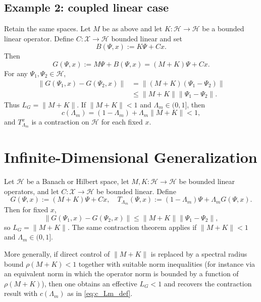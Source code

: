 \documentclass[11pt]{article}
\begin{document}
\subsection{Example 2: coupled linear case}

Retain the same spaces. Let $M$ be as above and let $K : \mathcal{H} \to \mathcal{H}$ be a bounded linear operator. Define $C : \mathcal{X} \to \mathcal{H}$ bounded linear and set
\begin{equation}
  B(\Psi,x) := K\Psi + Cx.
\end{equation}
Then
\begin{equation}
  G(\Psi,x) := M\Psi + B(\Psi,x)
  =
  (M+K)\Psi + Cx.
\end{equation}
For any $\Psi_1,\Psi_2 \in \mathcal{H}$,
\begin{align*}
  \|G(\Psi_1,x) - G(\Psi_2,x)\|
  &=
  \|(M+K)(\Psi_1 - \Psi_2)\| \\
  &\leq
  \|M+K\| \|\Psi_1 - \Psi_2\|.
\end{align*}
Thus $L_G = \|M+K\|$. If $\|M+K\| < 1$ and $\Lambda_m \in (0,1]$, then
\begin{equation}
  c(\Lambda_m) = (1 - \Lambda_m) + \Lambda_m \|M+K\| < 1,
\end{equation}
and $T_{\Lambda_m}^x$ is a contraction on $\mathcal{H}$ for each fixed $x$.

\section{Infinite-Dimensional Generalization}

\begin{remark}
Let $\mathcal{H}$ be a Banach or Hilbert space, let $M,K : \mathcal{H} \to \mathcal{H}$ be bounded linear operators, and let $C : \mathcal{X} \to \mathcal{H}$ be bounded linear. Define
\begin{equation}
  G(\Psi,x) := (M+K)\Psi + Cx,
  \quad
  T_{\Lambda_m}(\Psi,x)
  := (1 - \Lambda_m)\Psi + \Lambda_m G(\Psi,x).
\end{equation}
Then for fixed $x$,
\begin{equation}
  \|G(\Psi_1,x) - G(\Psi_2,x)\|
  \leq
  \|M+K\| \|\Psi_1 - \Psi_2\|,
\end{equation}
so $L_G = \|M+K\|$. The same contraction theorem applies if $\|M+K\| < 1$ and $\Lambda_m \in (0,1]$.

More generally, if direct control of $\|M+K\|$ is replaced by a spectral radius bound $\rho(M+K) < 1$ together with suitable norm inequalities (for instance via an equivalent norm in which the operator norm is bounded by a function of $\rho(M+K)$), then one obtains an effective $L_G < 1$ and recovers the contraction result with $c(\Lambda_m)$ as in \eqref{eq:c_Lm_def}.
\end{remark}
\end{document}
